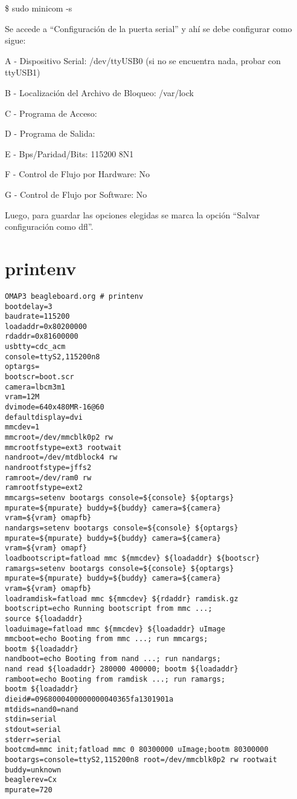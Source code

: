 \bigskip
\centerline{\$ sudo minicom -s}

\bigskip
Se accede a “Configuración de la puerta serial” y ahí se debe configurar como sigue: 

A - Dispositivo Serial: /dev/ttyUSB0 (si no se encuentra nada, probar con ttyUSB1) 

B - Localización del Archivo de Bloqueo: /var/lock 

C - Programa de Acceso: 

D - Programa de Salida: 

E - Bps/Paridad/Bits: 115200 8N1 

F - Control de Flujo por Hardware: No 

G - Control de Flujo por Software: No 

\bigskip
Luego, para guardar las opciones elegidas se marca la opción “Salvar configuración como dfl”. 

\section{printenv}\label{printenv}

\begin{verbatim}
OMAP3 beagleboard.org # printenv
bootdelay=3 
baudrate=115200 
loadaddr=0x80200000 
rdaddr=0x81600000 
usbtty=cdc_acm 
console=ttyS2,115200n8 
optargs= 
bootscr=boot.scr 
camera=lbcm3m1 
vram=12M 
dvimode=640x480MR-16@60 
defaultdisplay=dvi 
mmcdev=1 
mmcroot=/dev/mmcblk0p2 rw 
mmcrootfstype=ext3 rootwait 
nandroot=/dev/mtdblock4 rw 
nandrootfstype=jffs2 
ramroot=/dev/ram0 rw 
ramrootfstype=ext2 
mmcargs=setenv bootargs console=${console} ${optargs}
mpurate=${mpurate} buddy=${buddy} camera=${camera} 
vram=${vram} omapfb} 
nandargs=setenv bootargs console=${console} ${optargs} 
mpurate=${mpurate} buddy=${buddy} camera=${camera} 
vram=${vram} omapf} 
loadbootscript=fatload mmc ${mmcdev} ${loadaddr} ${bootscr} 
ramargs=setenv bootargs console=${console} ${optargs} 
mpurate=${mpurate} buddy=${buddy} camera=${camera} 
vram=${vram} omapfb} 
loadramdisk=fatload mmc ${mmcdev} ${rdaddr} ramdisk.gz 
bootscript=echo Running bootscript from mmc ...; 
source ${loadaddr} 
loaduimage=fatload mmc ${mmcdev} ${loadaddr} uImage 
mmcboot=echo Booting from mmc ...; run mmcargs; 
bootm ${loadaddr} 
nandboot=echo Booting from nand ...; run nandargs; 
nand read ${loadaddr} 280000 400000; bootm ${loadaddr} 
ramboot=echo Booting from ramdisk ...; run ramargs; 
bootm ${loadaddr} 
dieid#=0968000400000000040365fa1301901a 
mtdids=nand0=nand 
stdin=serial 
stdout=serial 
stderr=serial 
bootcmd=mmc init;fatload mmc 0 80300000 uImage;bootm 80300000 
bootargs=console=ttyS2,115200n8 root=/dev/mmcblk0p2 rw rootwait 
buddy=unknown 
beaglerev=Cx 
mpurate=720
\end{verbatim}

